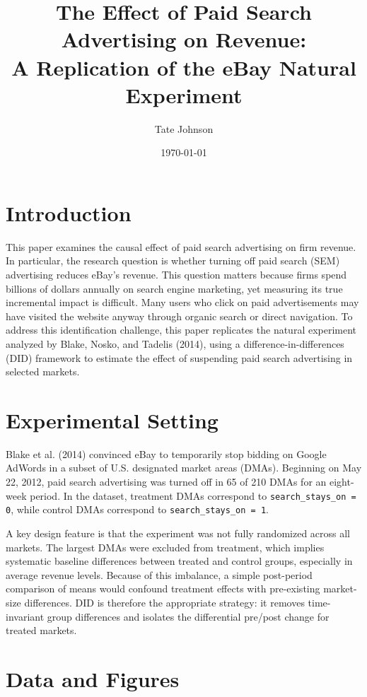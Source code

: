 \documentclass[12pt]{article}
\title{The Effect of Paid Search Advertising on Revenue: \\
A Replication of the eBay Natural Experiment}
\author{Tate Johnson}
\date{\today}
\begin{document}
\maketitle

\section{Introduction}

This paper examines the causal effect of paid search advertising on firm revenue. In particular, the research question is whether turning off paid search (SEM) advertising reduces eBay’s revenue. This question matters because firms spend billions of dollars annually on search engine marketing, yet measuring its true incremental impact is difficult. Many users who click on paid advertisements may have visited the website anyway through organic search or direct navigation. To address this identification challenge, this paper replicates the natural experiment analyzed by Blake, Nosko, and Tadelis (2014), using a difference-in-differences (DID) framework to estimate the effect of suspending paid search advertising in selected markets.

\section{Experimental Setting}

Blake et al. (2014) convinced eBay to temporarily stop bidding on Google AdWords in a subset of U.S. designated market areas (DMAs). Beginning on May 22, 2012, paid search advertising was turned off in 65 of 210 DMAs for an eight-week period. In the dataset, treatment DMAs correspond to \texttt{search\_stays\_on = 0}, while control DMAs correspond to \texttt{search\_stays\_on = 1}.

A key design feature is that the experiment was not fully randomized across all markets. The largest DMAs were excluded from treatment, which implies systematic baseline differences between treated and control groups, especially in average revenue levels. Because of this imbalance, a simple post-period comparison of means would confound treatment effects with pre-existing market-size differences. DID is therefore the appropriate strategy: it removes time-invariant group differences and isolates the differential pre/post change for treated markets.

\section{Data and Figures}
\end{document}

